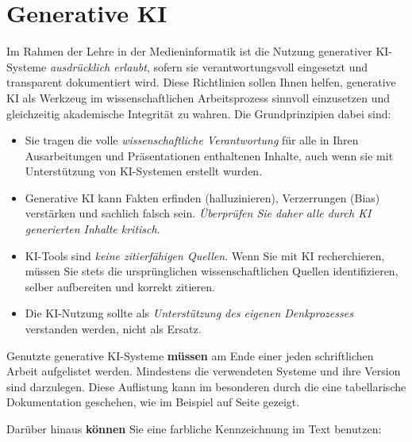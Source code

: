 \documentclass[12pt,        %
  english,ngerman,          %
  paper=a4,                 %
  captions=tablesignature,  %
  listof=numbered,          %
  bibliography=totoc,       %
  headings=small,           %
  headinclude=false,        %
  footinclude=false,        %
  parskip=half-,            %
  oneside,                  %
  DIV=12                    %
  ]{scrbook}                %
\begin{document}
\section{Generative KI}

  
Im Rahmen der Lehre in der Medieninformatik ist die Nutzung generativer KI-Systeme \textit{ausdrücklich erlaubt}, sofern sie verantwortungsvoll eingesetzt und transparent dokumentiert wird. Diese Richtlinien sollen Ihnen helfen, generative KI als Werkzeug im wissenschaftlichen Arbeitsprozess sinnvoll einzusetzen und gleichzeitig akademische Integrität zu wahren. Die Grundprinzipien dabei sind:
    
\begin{itemize}
  \item Sie tragen die volle \textit{wissenschaftliche Verantwortung} für alle in Ihren Ausarbeitungen und Präsentationen enthaltenen Inhalte, auch wenn sie mit Unterstützung von KI-Systemen erstellt wurden.
  \item Generative KI kann Fakten erfinden (halluzinieren), Verzerrungen (Bias) verstärken und sachlich falsch sein. \textit{Überprüfen Sie daher alle durch KI generierten Inhalte kritisch}.    
  \item KI-Tools sind \textit{keine zitierfähigen Quellen}. Wenn Sie mit KI recherchieren, müssen Sie stets die ursprünglichen wissenschaftlichen Quellen identifizieren, selber aufbereiten und korrekt zitieren.
  \item Die KI-Nutzung sollte als \textit{Unterstützung des eigenen Denkprozesses} verstanden werden, nicht als Ersatz.
\end{itemize}

Genutzte generative KI-Systeme \textbf{müssen} am Ende einer jeden schriftlichen Arbeit aufgelistet werden. Mindestens die verwendeten Systeme und ihre Version sind darzulegen. Diese Auflistung kann im besonderen durch die eine tabellarische Dokumentation geschehen, wie im Beispiel auf Seite \pageref{sec:ai_use} gezeigt.

 
Darüber hinaus \textbf{können} Sie eine farbliche Kennzeichnung im Text benutzen:
  
\end{document}
